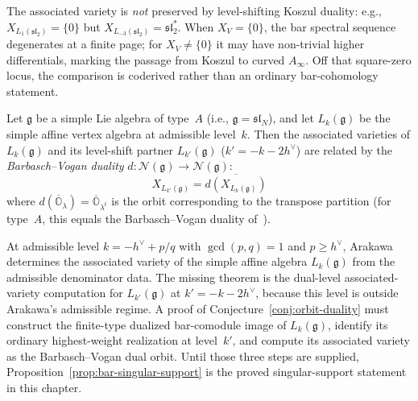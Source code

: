 \begin{remark}
\label{rem:associated-variety-koszul}
The associated variety is \emph{not} preserved by level-shifting Koszul
duality: e.g., $X_{L_1(\mathfrak{sl}_2)} = \{0\}$ but
$X_{L_{-3}(\mathfrak{sl}_2)} = \mathfrak{sl}_2^*$. When $X_V = \{0\}$,
the bar spectral sequence degenerates at a finite page; for
$X_V \neq \{0\}$ it may have non-trivial higher differentials, marking
the passage from Koszul to curved $A_\infty$. Off that square-zero
locus, the comparison is coderived rather than an ordinary
bar-cohomology statement.
\end{remark}

\begin{conjecture}
\label{conj:orbit-duality}
Let $\mathfrak{g}$ be a simple Lie algebra of type~$A$
\textup{(}i.e., $\mathfrak{g} = \mathfrak{sl}_N$\textup{)}, and let
$L_k(\mathfrak{g})$ be the simple affine vertex algebra at admissible
level~$k$. Then the associated varieties of $L_k(\mathfrak{g})$ and
its level-shift partner $L_{k'}(\mathfrak{g})$ ($k' = -k - 2h^\vee$)
are related by the \emph{Barbasch--Vogan duality} $d\colon
\mathcal{N}(\mathfrak{g}) \to \mathcal{N}(\mathfrak{g})$:
\begin{equation}\label{eq:orbit-duality}
X_{L_{k'}(\mathfrak{g})} = \overline{d(X_{L_k(\mathfrak{g})})}
\end{equation}
where $d(\overline{\mathbb{O}}_\lambda) =
\overline{\mathbb{O}}_{\lambda^t}$ is the orbit corresponding
to the transpose partition \textup{(}for type~$A$, this equals
the Barbasch--Vogan duality of~\cite{BV85}\textup{)}.
\end{conjecture}

\begin{remark}
\label{rem:orbit-duality-evidence}
At admissible level $k = -h^\vee + p/q$ with $\gcd(p,q) = 1$ and
$p \geq h^\vee$, Arakawa~\cite{Arakawa17} determines the associated
variety of the simple affine algebra $L_k(\mathfrak{g})$ from the
admissible denominator data. The missing theorem is the dual-level
associated-variety computation for
$L_{k'}(\mathfrak{g})$ at $k' = -k - 2h^\vee$, because this level is
outside Arakawa's admissible regime. A proof of
Conjecture~\ref{conj:orbit-duality} must construct the finite-type
dualized bar-comodule image of $L_k(\mathfrak g)$, identify its
ordinary highest-weight realization at level~$k'$, and compute its
associated variety as the Barbasch--Vogan dual orbit. Until those three
steps are supplied, Proposition~\ref{prop:bar-singular-support} is the
proved singular-support statement in this chapter.
\end{remark}

